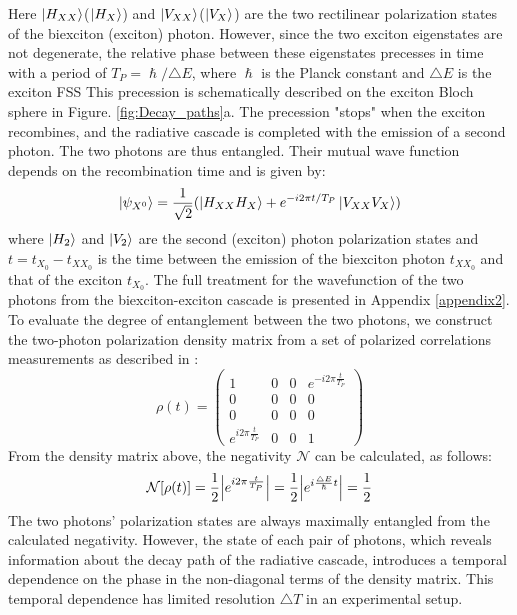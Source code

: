 	Here $\ket{H_{XX}}$($\ket{H_{X}}$) and $\ket{V_{XX}}$($\ket{V_{X}}$) are the two rectilinear polarization states of the biexciton (exciton) photon. However, since the two exciton eigenstates are not degenerate, the relative phase between these eigenstates precesses in time with a period of $T_P = \hslash /\triangle E$, where $\hslash$ is the Planck constant and $\triangle E$ is the exciton FSS \cite{Winik2017}
	This precession is schematically described on the exciton Bloch sphere in Figure. \ref{fig:Decay_paths}a.
	The precession "stops" when the exciton recombines, and the radiative cascade is completed with the emission of a second photon. The two photons are thus entangled. Their mutual wave function depends on the recombination time and is given by:
	\begin{equation}
		\ket{\psi_{X^0}} = \frac{1}{\sqrt{2}}(\ket{H_{XX}H_{X}} +e^{-i2\pi t/T_P}\ket{V_{XX}V_X})
	\end{equation}
	where $\ket{H_2}$ and $\ket{V_2}$ are the second (exciton) photon polarization states and $t = t_{X_0} - t_{{XX}_0}$ is the time between the emission of the biexciton photon $t_{{XX}_0}$ and that of the exciton $t_{X_0}$. The full treatment for the wavefunction of the two photons from the biexciton-exciton cascade is presented in Appendix \ref{appendix2}.\\
   To evaluate the degree of entanglement between the two photons, we construct the two-photon polarization density matrix from a set of polarized correlations measurements as described in \cite{Kiwat2001}:
   \begin{equation}
   \rho(t) = 
       \begin{pmatrix}
1 & 0 & 0 & e^{-i2\pi \frac{t}{T_P}}\\
0 & 0 & 0 & 0 \\
0 & 0 & 0 & 0 \\
e^{i2\pi \frac{t}{T_P}} & 0 & 0 & 1 
\end{pmatrix}
   \end{equation}
   From the density matrix above, the negativity $\mathcal{N}$ can be calculated, as follows:
   \begin{equation}
		\mathcal{N}[\rho(t)] = \frac{1}{2}\abs{e^{i2\pi \frac{t}{T_P}}} =\frac{1}{2}\abs{e^{i\frac{\triangle E}{\hslash}t}}=\frac{1}{2}
	\end{equation}
 The two photons' polarization states are always maximally entangled from the calculated negativity. However, the state of each pair of photons, which reveals information about the decay path of the radiative cascade, introduces a temporal dependence on the phase in the non-diagonal terms of the density matrix. This temporal dependence has limited resolution $\triangle T$ in an experimental setup.
